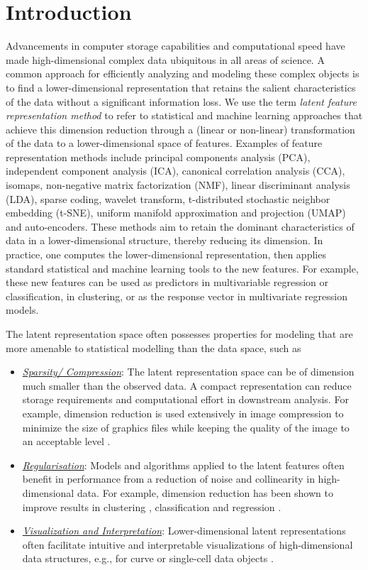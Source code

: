 \section{Introduction}

Advancements in computer storage capabilities and computational speed have made high-dimensional complex data ubiquitous in all areas of science. A common approach for efficiently analyzing and modeling these complex objects is to find a lower-dimensional representation that retains the salient characteristics of the data without a significant information loss.
We use the term \emph{latent feature representation method} to refer to statistical and machine learning approaches that achieve this dimension reduction through a (linear or non-linear) transformation of the data to a lower-dimensional space of features.
Examples of feature representation methods include principal components analysis (PCA), independent component analysis (ICA), canonical correlation analysis (CCA), isomaps, non-negative matrix factorization (NMF), linear discriminant analysis (LDA), sparse coding, wavelet transform, t-distributed stochastic neighbor embedding (t-SNE), uniform manifold approximation and projection (UMAP) and auto-encoders. 
These methods aim to retain the dominant characteristics of data in a lower-dimensional structure, thereby reducing its dimension. 
In practice, one computes the lower-dimensional representation, then applies standard statistical and machine learning tools to the new features. 
For example, these new features can be used as predictors in multivariable regression or classification, in clustering, or as the response vector in multivariate regression models.

The latent representation space often possesses properties for modeling that are more amenable to statistical modelling than the data space, such as
\begin{itemize}
    \item \emph{\underline{Sparsity/ Compression}}: The latent representation space can be of dimension much smaller than the observed data. A compact representation can reduce storage requirements and computational effort in downstream analysis. For example, dimension reduction is used extensively in image compression to minimize the size of graphics files while keeping the quality of the image to an acceptable level \parencite{marcellin_overview_2000}.
    \item \emph{\underline{Regularisation}}: Models and algorithms applied to the latent features often benefit in performance from a reduction of noise and collinearity in high-dimensional data. For example, dimension reduction has been shown to improve results in clustering \parencite{niu_dimensionality_2011}, classification \parencite{wang_role_2014} and regression \parencite{cook_fisher_2007}.
    \item \emph{\underline{Visualization and Interpretation}}: Lower-dimensional latent representations often facilitate intuitive and interpretable visualizations of high-dimensional data structures, e.g., for curve or single-cell data objects \parencite{jones_displaying_1992, maaten_visualizing_2008, hyndman_rainbow_2010, becht_dimensionality_2019}.
\end{itemize}


